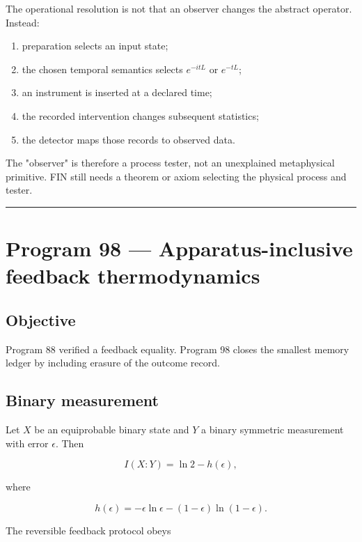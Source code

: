 \documentclass[11pt,a4paper,openany]{report}
\begin{document}
The operational resolution is not that an observer changes the abstract operator. Instead:

\begin{enumerate}
\item 
preparation selects an input state;

\item 
the chosen temporal semantics selects \(e^{-itL}\) or \(e^{-tL}\);

\item 
an instrument is inserted at a declared time;

\item 
the recorded intervention changes subsequent statistics;

\item 
the detector maps those records to observed data.

\end{enumerate}

The "observer" is therefore a process tester, not an unexplained metaphysical primitive. FIN still needs a theorem or axiom selecting the physical process and tester.

\par\medskip\hrule\medskip

\chapter{Program 98 --- Apparatus-inclusive feedback thermodynamics}

\section{Objective}

Program 88 verified a feedback equality. Program 98 closes the smallest memory ledger by including erasure of the outcome record.

\section{Binary measurement}

Let \(X\) be an equiprobable binary state and \(Y\) a binary symmetric measurement with error \(\epsilon\). Then

\[
I(X:Y)
=
\ln2-h(\epsilon),
\]

where

\[
h(\epsilon)
=
-\epsilon\ln\epsilon
-(1-\epsilon)\ln(1-\epsilon).
\]

The reversible feedback protocol obeys
\end{document}
